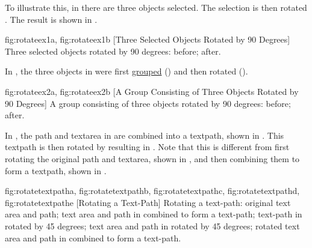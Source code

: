 To illustrate this, in  there are three
\glspl*{object} selected.  The selection is then rotated
.  The result is shown in .

{
 {fig:rotateex1a}{}{},
 {fig:rotateex1b}{}{}
}
[Three Selected Objects Rotated by 90 Degrees]
{Three selected objects rotated by 90 degrees: 
 before;
 after.}

In , the three objects in
 were first \hyperref[sec:grouping]{grouped}
() and then rotated 
().

{
 {fig:rotateex2a}{}{},
 {fig:rotateex2b}{}{}
}
[A Group Consisting of Three Objects Rotated by 90 Degrees]
{A group consisting of three objects rotated by 90 degrees:
 before;  after.}

In , the \gls*{path} and
\gls*{textarea} in  are
combined into a \gls*{textpath}, shown in
. This \gls*{textpath} is then
rotated by  resulting in
. Note that this is different
from first rotating the original \gls*{path} and \gls*{textarea},
shown in , and then combining
them to form a \gls*{textpath}, shown in
.

{
 {fig:rotatetextpatha}{}{},
 {fig:rotatetextpathb}{}{},
 {fig:rotatetextpathc}{}{},
 {fig:rotatetextpathd}{}{},
 {fig:rotatetextpathe}{}{}
}
[Rotating a Text-Path]
{Rotating a text-path: 
 original text area and path; 
 text area and path in
 combined to form a text-path;
 text-path in
 rotated by 45 degrees;
 text area and path in
 rotated by 45 degrees;
 rotated text area and
path in  combined to form a text-path.}

